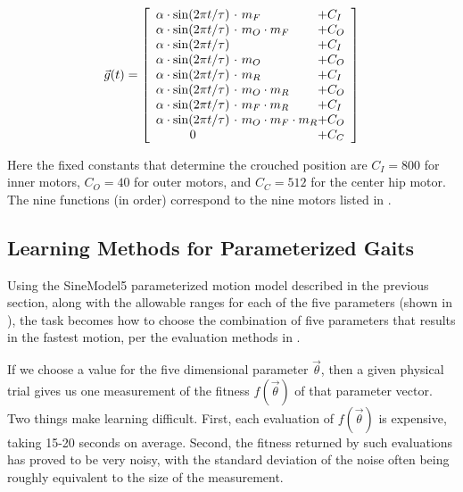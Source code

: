 \[
\vec{g}(t) =
\left[ {\begin{array}{c@{ }l@{ }l}
\amp \cdot \sin(2\pi t / \tau) & \ \cdot \           m_F            & + C_I \\ %
\amp \cdot \sin(2\pi t / \tau) & \ \cdot \ m_O \cdot m_F            & + C_O \\ %
\amp \cdot \sin(2\pi t / \tau) & \                                  & + C_I \\ %
\amp \cdot \sin(2\pi t / \tau) & \ \cdot \ m_O                      & + C_O \\ %
\amp \cdot \sin(2\pi t / \tau) & \ \cdot \                     m_R  & + C_I \\ %
\amp \cdot \sin(2\pi t / \tau) & \ \cdot \ m_O           \cdot m_R  & + C_O \\ %
\amp \cdot \sin(2\pi t / \tau) & \ \cdot \           m_F \cdot m_R  & + C_I \\ %
\amp \cdot \sin(2\pi t / \tau) & \ \cdot \ m_O \cdot m_F \cdot m_R  & + C_O \\ %
0                              & \                                  & + C_C \\ %
\end{array} } \right]
\]

\noindent Here the fixed constants that determine the crouched
position are $C_I = 800$ for inner motors, $C_O = 40$ for outer
motors, and $C_C = 512$ for the center hip motor.  The nine functions (in order)
correspond to the nine motors listed in
.



\subsection{Learning Methods for Parameterized Gaits}

Using the SineModel5 parameterized motion model described in the
previous section, along with the allowable ranges for each of the five
parameters (shown in ), the task becomes how to
choose the combination of five parameters that results in the fastest
motion, per the evaluation methods in .

If we choose a value for the five dimensional parameter
$\vec{\theta}$, then a given physical trial gives us one measurement
of the fitness $f(\vec{\theta})$ of that parameter vector.  Two
things make learning difficult.  First, each evaluation of
$f(\vec{\theta})$ is expensive, taking 15-20 seconds on
average.  Second, the fitness returned by such evaluations has proved
to be very noisy, with the standard deviation of the noise often being
roughly equivalent to the size of the measurement.

